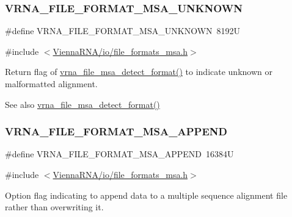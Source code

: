 \subsubsection{\texorpdfstring{V\+R\+N\+A\+\_\+\+F\+I\+L\+E\+\_\+\+F\+O\+R\+M\+A\+T\+\_\+\+M\+S\+A\+\_\+\+U\+N\+K\+N\+O\+WN}{VRNA\_FILE\_FORMAT\_MSA\_UNKNOWN}}
{\footnotesize\ttfamily \#define V\+R\+N\+A\+\_\+\+F\+I\+L\+E\+\_\+\+F\+O\+R\+M\+A\+T\+\_\+\+M\+S\+A\+\_\+\+U\+N\+K\+N\+O\+WN~8192U}



{\ttfamily \#include $<$\hyperlink{io_2file__formats__msa_8h}{Vienna\+R\+N\+A/io/file\+\_\+formats\+\_\+msa.\+h}$>$}



Return flag of \hyperlink{group__file__formats__msa_ga627ac281b5f11c63861726e6472626c9}{vrna\+\_\+file\+\_\+msa\+\_\+detect\+\_\+format()} to indicate unknown or malformatted alignment. 

\begin{DoxySeeAlso}{See also}
\hyperlink{group__file__formats__msa_ga627ac281b5f11c63861726e6472626c9}{vrna\+\_\+file\+\_\+msa\+\_\+detect\+\_\+format()} 
\end{DoxySeeAlso}
\mbox{\label{group__file__formats__msa_ga1577ea0f497d9c501549c863a4f2c089}} 
\subsubsection{\texorpdfstring{V\+R\+N\+A\+\_\+\+F\+I\+L\+E\+\_\+\+F\+O\+R\+M\+A\+T\+\_\+\+M\+S\+A\+\_\+\+A\+P\+P\+E\+ND}{VRNA\_FILE\_FORMAT\_MSA\_APPEND}}
{\footnotesize\ttfamily \#define V\+R\+N\+A\+\_\+\+F\+I\+L\+E\+\_\+\+F\+O\+R\+M\+A\+T\+\_\+\+M\+S\+A\+\_\+\+A\+P\+P\+E\+ND~16384U}



{\ttfamily \#include $<$\hyperlink{io_2file__formats__msa_8h}{Vienna\+R\+N\+A/io/file\+\_\+formats\+\_\+msa.\+h}$>$}



Option flag indicating to append data to a multiple sequence alignment file rather than overwriting it. 

